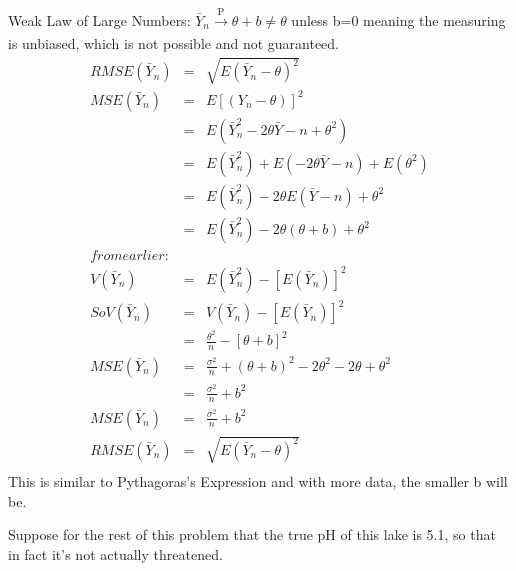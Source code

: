\documentclass[12pt]{article}
\begin{document}
Weak Law of Large Numbers: $\bar Y_n \xrightarrow[\text{ }]{\text{P}} \theta + b \neq \theta$ unless b=0 meaning the measuring is unbiased, which is not possible and not guaranteed. \\
\begin{eqnarray}
RMSE \left( \bar{ Y }_n \right) & = & \sqrt{ E(\bar Y_n - \theta)^2 }  \nonumber \\
MSE(\bar Y_n) & = & E[(Y_n-\theta)]^2 \nonumber \\
& = & E(\bar Y_n^2 - 2\theta \bar Y-n + \theta^2) \nonumber \\
& = & E(\bar Y_n^2) + E(-2\theta \bar Y-n) + E(\theta^2) \nonumber \\
& = & E(\bar Y_n^2) -2\theta E( \bar Y-n) + \theta^2 \nonumber \\
& = & E(\bar Y_n^2) -2\theta ( \theta +b) + \theta^2 \nonumber \\
 from earlier:  \nonumber \\
V(\bar Y_n) & = & E(\bar Y_n^2) - [E(\bar Y_n)]^2 \nonumber \\
 So V(\bar Y_n) & = & V(\bar Y_n) - [E(\bar Y_n)]^2 \nonumber \\
& = & \frac{\theta^2}{n} - [\theta + b]^2 \nonumber \\
MSE(\bar Y_n) & = & \frac{\sigma^2}{n}+(\theta+b)^2 -2\theta^2 -2\theta + \theta^2 \nonumber \\
& = & \frac{\sigma^2}{n} + b^2 \nonumber \\
MSE(\bar Y_n) & = & \frac{\sigma^2}{n} + b^2 \nonumber \\
RMSE \left( \bar{ Y }_n \right) & = & \sqrt{ E(\bar Y_n - \theta)^2 } \nonumber \\ \nonumber 
\end{eqnarray}
This is similar to Pythagoras's Expression and with more data, the smaller b will be. 



\medskip

Suppose for the rest of this problem that the true pH of this lake is 5.1, so that in fact it's not actually threatened.
\end{document}
